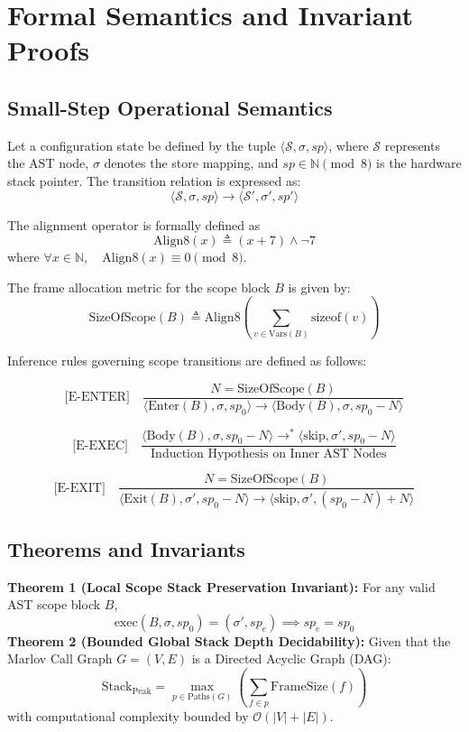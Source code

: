 \documentclass[conference]{IEEEtran}
\begin{document}
\section{Formal Semantics and Invariant Proofs}

\subsection{Small-Step Operational Semantics}
Let a configuration state be defined by the tuple $\langle \mathcal{S}, \sigma, sp \rangle$, where $\mathcal{S}$ represents the AST node, $\sigma$ denotes the store mapping, and $sp \in \mathbb{N} \pmod 8$ is the hardware stack pointer. The transition relation is expressed as:
\[\langle \mathcal{S}, \sigma, sp \rangle \longrightarrow \langle \mathcal{S}', \sigma', sp' \rangle\]

The alignment operator is formally defined as
\[\mathrm{Align8}(x) \triangleq (x + 7) \land \neg 7\]
where   $\forall x \in \mathbb{N}, \quad \mathrm{Align8}(x) \equiv 0 \pmod 8$.

The frame allocation metric for the scope block $B$ is given by:
\[\mathrm{SizeOfScope}(B) \triangleq \mathrm{Align8}\left( \sum_{v \in \mathrm{Vars}(B)} \mathrm{sizeof}(v) \right)\]

Inference rules governing scope transitions are defined as follows:

\[\text{[E-ENTER]} \quad \frac{N = \mathrm{SizeOfScope}(B)}{\langle \mathrm{Enter}(B), \sigma, sp_0 \rangle \longrightarrow \langle \mathrm{Body}(B), \sigma, sp_0 - N \rangle}\]

\[\text{[E-EXEC]} \quad \frac{\langle \mathrm{Body}(B), \sigma, sp_0 - N \rangle \longrightarrow^* \langle \text{skip}, \sigma', sp_0 - N \rangle}{\text{Induction Hypothesis on Inner AST Nodes}}\]

\[\text{[E-EXIT]} \quad \frac{N = \mathrm{SizeOfScope}(B)}{\langle \mathrm{Exit}(B), \sigma', sp_0 - N \rangle \longrightarrow \langle \text{skip}, \sigma', (sp_0 - N) + N \rangle}\]

\subsection{Theorems and Invariants}

\textbf{Theorem 1 (Local Scope Stack Preservation Invariant):} 
For any valid AST scope block $B$,
\[\text{exec}(B, \sigma, sp_0) = (\sigma', sp_e) \implies sp_e = sp_0\]
\textbf{Theorem 2 (Bounded Global Stack Depth Decidability):} 
Given that the Marlov Call Graph $G = (V, E)$ is a Directed Acyclic Graph (DAG):
\[\mathrm{Stack}_{\mathrm{Peak}} = \max_{p \in \text{Paths}(G)} \left( \sum_{f \in p} \mathrm{FrameSize}(f) \right)\]
with computational complexity bounded by $\mathcal{O}(|V| + |E|)$.
\end{document}
